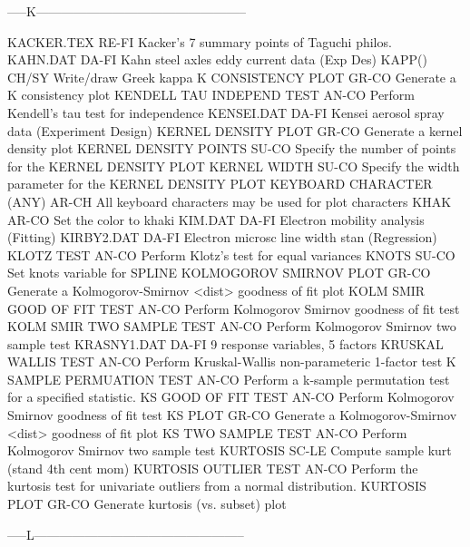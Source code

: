 -----K--------------------------------------------------

KACKER.TEX                  RE-FI Kacker's 7 summary points of Taguchi philos.
KAHN.DAT                    DA-FI Kahn steel axles eddy current data (Exp Des)
KAPP()                      CH/SY Write/draw Greek kappa
K CONSISTENCY PLOT          GR-CO Generate a K consistency plot
KENDELL TAU INDEPEND TEST   AN-CO Perform Kendell's tau test for independence
KENSEI.DAT                  DA-FI Kensei aerosol spray data (Experiment Design)
KERNEL DENSITY PLOT         GR-CO Generate a kernel density plot
KERNEL DENSITY POINTS       SU-CO Specify the number of points for the KERNEL DENSITY PLOT
KERNEL WIDTH                SU-CO Specify the width parameter for the KERNEL DENSITY PLOT
KEYBOARD CHARACTER (ANY)    AR-CH All keyboard characters may be used for plot characters
KHAK                        AR-CO Set the color to khaki
KIM.DAT                     DA-FI Electron mobility analysis (Fitting)
KIRBY2.DAT                  DA-FI Electron microsc line width stan (Regression)
KLOTZ TEST                  AN-CO Perform Klotz's test for equal variances
KNOTS                       SU-CO Set knots variable for SPLINE
KOLMOGOROV SMIRNOV PLOT     GR-CO Generate a Kolmogorov-Smirnov <dist> goodness of fit plot
KOLM SMIR GOOD OF FIT TEST  AN-CO Perform Kolmogorov Smirnov goodness of fit test
KOLM SMIR TWO SAMPLE TEST   AN-CO Perform Kolmogorov Smirnov two sample test
KRASNY1.DAT                 DA-FI 9 response variables, 5 factors
KRUSKAL WALLIS TEST         AN-CO Perform Kruskal-Wallis non-parameteric 1-factor test
K SAMPLE PERMUATION TEST    AN-CO Perform a k-sample permutation test for a specified statistic.
KS GOOD OF FIT TEST         AN-CO Perform Kolmogorov Smirnov goodness of fit test
KS PLOT                     GR-CO Generate a Kolmogorov-Smirnov <dist> goodness of fit plot
KS TWO SAMPLE TEST          AN-CO Perform Kolmogorov Smirnov two sample test
KURTOSIS                    SC-LE Compute sample kurt (stand 4th cent mom)
KURTOSIS OUTLIER TEST       AN-CO Perform the kurtosis test for univariate outliers from a normal distribution.
KURTOSIS PLOT               GR-CO Generate kurtosis (vs. subset) plot

-----L--------------------------------------------------

